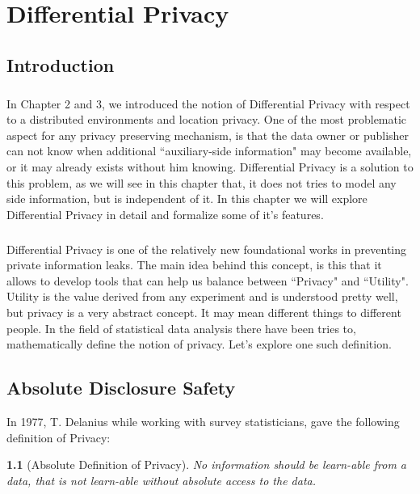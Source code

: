 \documentclass[12pt]{report}
\theoremstyle{named}
\newtheorem*{namedtheorem}{}
\begin{document}
\chapter{Differential Privacy}
\label{chap:differentialPrivacy}
\section{Introduction}
\paragraph{}
In Chapter 2 and 3, we introduced the notion of Differential Privacy with respect to a distributed environments and location privacy. One of the most problematic aspect for any privacy preserving mechanism, is that the data owner or publisher can not know when additional ``auxiliary-side information" may become available, or it may already exists without him knowing. Differential Privacy is a solution to this problem, as we will see in this chapter that, it does not tries to model any side information, but is independent of it. In this chapter we will explore Differential Privacy in detail and formalize some of it's features. 

\paragraph{}
Differential Privacy \cite{Dwork:2006:DP:2097282.2097284} is one of the relatively new foundational works in preventing private information leaks. The main idea behind this concept, is this that it allows to develop tools that can help us balance between ``Privacy" and ``Utility". Utility is the value derived from any experiment and is understood pretty well, but privacy is a very abstract concept. It may mean different things to different people. In the field of statistical data analysis there have been tries to, mathematically define the notion of privacy. Let's explore one such definition.

\section{Absolute Disclosure Safety}

In 1977, T. Delanius while working with survey statisticians, gave the following definition of Privacy:
\begin{namedtheorem}[Absolute Definition of Privacy\cite{dalenius1977}]
No information should be learn-able from a data, that is not learn-able without absolute access to the data.
\end{namedtheorem}
\end{document}
